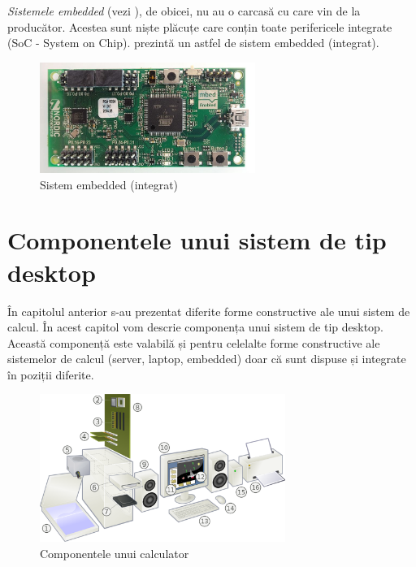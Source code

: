 \textit{Sistemele embedded} (vezi ), de obicei,
nu au o carcasă cu care vin de la producător. Acestea sunt niște plăcuțe care
conțin toate perifericele integrate (SoC - System on Chip).
 prezintă un astfel de sistem embedded
(integrat).

\begin{figure}[!htbp]
	\centering
	\includegraphics[width=7cm]{chapters/08-hw/img/embedded-img.png}
	\caption{Sistem embedded (integrat)\protect\footnotemark}
	\label{fig:hw-embed}
\end{figure}


\section{Componentele unui sistem de tip desktop}
\label{sec:hardware-componente}

În capitolul anterior s-au prezentat diferite forme constructive ale unui sistem
de calcul. În acest capitol vom descrie componența unui sistem de tip desktop.
Această componență este valabilă și pentru celelalte forme constructive ale
sistemelor de calcul (server, laptop, embedded) doar că sunt dispuse și
integrate în poziții diferite.

\begin{figure}[!htbp]
	\centering
	\includegraphics[width=8cm]{chapters/08-hw/img/comps-img.png}
	\caption{Componentele unui calculator\protect\footnotemark}
	\label{fig:hw-comps}
\end{figure}

